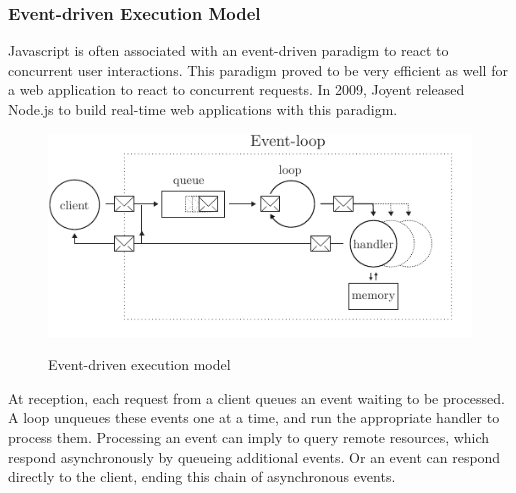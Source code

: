 \subsubsection{Event-driven Execution Model} \label{chapter2:web-as-a-platform:javascript:event-loop}

Javascript is often associated with an event-driven paradigm to react to concurrent user interactions.
This paradigm proved to be very efficient as well for a web application to react to concurrent requests.
In 2009, Joyent released Node.js to build real-time web applications with this paradigm.

\begin{figure}[h!]
  \centering
  \includegraphics[width=0.7\linewidth]{../resources/event-loop.pdf}
  \label{fig:event-loop}
  \caption{Event-driven execution model}
\end{figure}

At reception, each request from a client queues an event waiting to be processed.
A loop unqueues these events one at a time, and run the appropriate handler to process them.
Processing an event can imply to query remote resources, which respond asynchronously by queueing additional events.
Or an event can respond directly to the client, ending this chain of asynchronous events.


